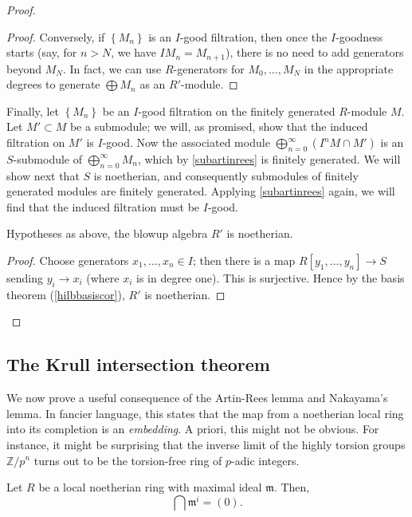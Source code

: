 \begin{proof}
\begin{proof}
Conversely, if $\left\{M_n\right\}$ is an $I$-good filtration, then once the
$I$-goodness starts (say, for $n>N$, we have $IM_{n} = M_{n+1}$), there is no
need to add generators beyond $M_{N}$. In fact, we can use $R$-generators for
$M_0, \dots, M_N$ in the appropriate degrees to generate $\bigoplus M_n$ as an
$R'$-module.
\end{proof}

Finally, let $\left\{M_n\right\}$ be an $I$-good filtration on the finitely
generated $R$-module $M$. Let $M' \subset M$ be a submodule; we will, as
promised, show that the  induced filtration on $M'$ is $I$-good.
Now the associated module $\bigoplus_{n=0}^{\infty} (I^n M \cap M') $
is an $S$-submodule of $\bigoplus_{n=0}^{\infty} M_n$, which
by \cref{subartinrees} is finitely generated. We will show next that $S$
is noetherian, and consequently submodules of finitely generated
modules are finitely generated. Applying \cref{subartinrees} again, we will find
that the induced filtration must be $I$-good.

\begin{lemma} 
Hypotheses as above,  the blowup algebra $R'$ is noetherian.
\end{lemma} 
\begin{proof} 
Choose generators $x_1, \dots, x_n \in I$; then there is a map $R[y_1, \dots,
y_n] \to S$ sending $y_i \to x_i $ (where $x_i$ is in degree one). This is surjective. Hence by the basis
theorem (\cref{hilbbasiscor}), $R'$ is noetherian.
\end{proof} 


\end{proof} 


\subsection{The Krull intersection theorem}

We now prove a useful consequence of the Artin-Rees lemma and Nakayama's
lemma. In fancier language, this states that the map from a noetherian local
ring into its
completion is an \emph{embedding}. A priori, this might not be obvious. For
instance, it might be surprising that the inverse limit of the highly torsion
groups $\mathbb{Z}/p^n$ turns out to be the torsion-free ring of $p$-adic
integers.

\begin{theorem}[Krull] Let $R$ be a local noetherian ring with maximal ideal
$\mathfrak{m}$. Then,
\[ \bigcap \mathfrak{m}^i = (0).  \]
\end{theorem} 

